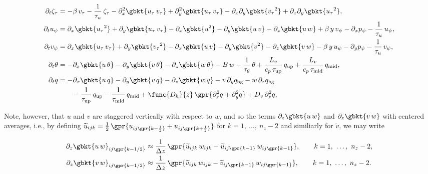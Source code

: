 \begin{subequations}
	\begin{align}
		\partial_t \zeta_\tau &= -\beta\,v_{\tau} - \frac{1}{\tau_u}\,\zeta_{\tau} - \partial_x^2 \gbkt{u_{\tau}\,v_{\tau}} + \partial_y^2 \gbkt{u_{\tau}\,v_{\tau}} - \partial_x \partial_y \gbkt{{v_{\tau}}^2} + \partial_x \partial_y \gbkt{{u_{\tau}}^2},\\
		\partial_t u_{\psi} &= \partial_x \gbkt{{u_\tau}^2} + \partial_y \gbkt{u_{\tau}\,v_{\tau}} - \partial_x \gbkt{u^2} - \partial_y \gbkt{u\,v} - \partial_z \gbkt{u\,w} + \beta\,y\,v_{\psi} - \partial_x p_{\psi} - \frac{1}{\tau_u}\,u_{\psi}, \\
		\partial_t v_{\psi} &= \partial_x \gbkt{u_{\tau}\,v_{\tau}} + \partial_y \gbkt{{v_{\tau}}^2} - \partial_x \gbkt{u\,v} - \partial_y \gbkt{v^2} - \partial_z \gbkt{v\,w} - \beta\,y\,u_{\psi} - \partial_y p_{\psi} - \frac{1}{\tau_u}\,v_{\psi}, \\
		\partial_t \theta &= -\partial_x \gbkt{u\,\theta} - \partial_y \gbkt{v\,\theta} - \partial_z \gbkt{w\,\theta} - B\,w - \frac{1}{\tau_{\theta}}\,\theta + \frac{L_v}{c_p\,\tau_{\text{up}}}\,q_{\text{up}} + \frac{L_v}{c_p\,\tau_{\text{mid}}}\,q_{\text{mid}}, \\
		\partial_t q &= -\partial_x \gbkt{u\,q} - \partial_y \gbkt{v\,q} - \partial_z \gbkt{w\,q} - v\,\partial_y q_{\text{bg}} - w\,\partial_z q_{\text{bg}} \nonumber \\
				&\qquad - \frac{1}{\tau_{\text{up}}}\,q_{\text{up}} - \frac{1}{\tau_{\text{mid}}}\,q_{\text{mid}} + \func{D_h}{z}\,\gpr{\partial_x^2 q + \partial_y^2 q} + D_v\,\partial_z^2 q, \\
	\end{align}
\end{subequations}

Note, however, that $u$ and $v$ are staggered vertically with respect to $w$, and so the terms $\partial_z \gbkt{u\,w}$ and $\partial_z \gbkt{v\,w}$ with centered averages, i.e., by defining $\widetilde{u}_{ijk} = \frac{1}{2}\,\gpr{u_{ij\gpr{k-\frac{1}{2}}} + u_{ij\gpr{k+\frac{1}{2}}}}$ for $k = 1,\ \dots,\ n_z - 2$ and similiarly for $\widetilde{v}$, we may write

\begin{subequations}
	\begin{align}
		\partial_z \gbkt{u\,w}_{ij\gpr{k-1/2}} &\approx \frac{1}{\Delta z}\,\gpr{\widetilde{u}_{ijk}\,w_{ijk} - \widetilde{u}_{ij\gpr{k-1}}\,w_{ij\gpr{k-1}}},\qquad k = 1,\ \dots,\ n_z - 2, \\
		\partial_z \gbkt{v\,w}_{ij\gpr{k-1/2}} &\approx \frac{1}{\Delta z}\,\gpr{\widetilde{v}_{ijk}\,w_{ijk} - \widetilde{v}_{ij\gpr{k-1}}\,w_{ij\gpr{k-1}}},\qquad k = 1,\ \dots,\ n_z - 2.
	\end{align}
	\label{eqs:uw_vw_vert_dervs}
\end{subequations}


